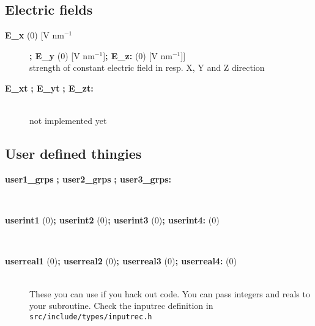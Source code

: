 \subsection{ Electric fields}
\begin{description}
\item[{\bf E\_x }(0) [V nm$^{-1}$]{\bf  ; E\_y }(0) [V nm$^{-1}$]{\bf  ; E\_z: }(0) {[V nm$^{-1}$]}]\mbox{}\\
strength of constant electric field in resp. X, Y and Z direction
\item[{\bf E\_xt }{\bf  ; E\_yt }{\bf  ; E\_zt: }]\mbox{}\\
not implemented yet
\end{description}

\subsection{ User defined thingies}
\begin{description}
\item[{\bf user1\_grps }{\bf  ; user2\_grps }{\bf  ; user3\_grps: }]\mbox{}\\
\item[{\bf userint1 }(0){\bf  ; userint2 }(0){\bf  ; userint3 }(0){\bf  ; userint4: }(0)]\mbox{}\\
\item[{\bf userreal1 }(0){\bf  ; userreal2 }(0){\bf  ; userreal3 }(0){\bf  ; userreal4: }(0)]\mbox{}\\
These you can use if you hack out code. You can pass integers and
reals to your subroutine. Check the inputrec definition in
{\tt src/include/types/inputrec.h}
\end{description}

